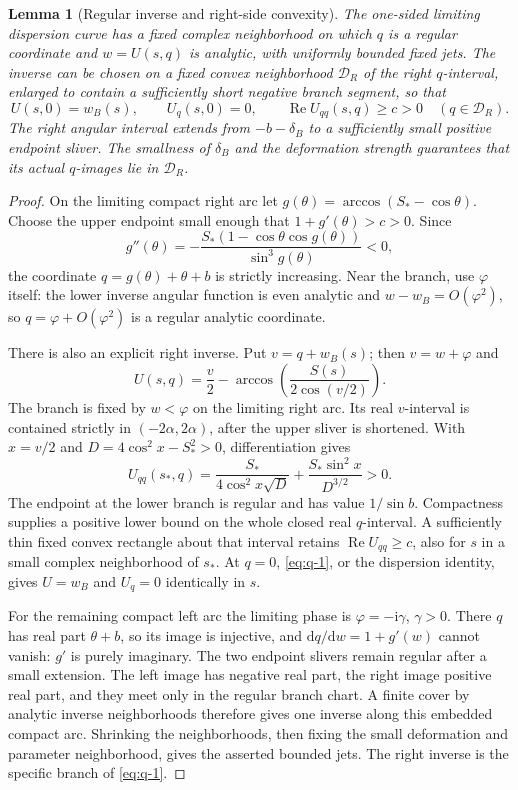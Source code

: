 \documentclass[11pt]{article}
\numberwithin{equation}{section}
\newtheorem{lemma}[theorem]{Lemma}
\theoremstyle{remark}\newtheorem{remark}[theorem]{Remark}
\newcommand{\ii}{\mathrm i}
\newcommand{\dd}{\mathrm d}
\newcommand{\Rea}{\operatorname{Re}}
\begin{document}
\begin{lemma}[Regular inverse and right-side convexity]\label{lem:inverse}
The one-sided limiting dispersion curve has a fixed complex
neighborhood on which $q$ is a regular coordinate and $w=U(s,q)$ is
analytic, with uniformly bounded fixed jets. The inverse can be chosen
on a fixed convex neighborhood $\mathcal D_R$ of the right $q$-interval,
enlarged to contain a sufficiently short negative branch segment, so
that
\[
 U(s,0)=w_B(s),\qquad U_q(s,0)=0,\qquad
 \Rea U_{qq}(s,q)\ge c>0 \quad(q\in\mathcal D_R).
\]
The right angular interval extends from $-b-\delta_B$ to a sufficiently
small positive endpoint sliver. The smallness of $\delta_B$ and the
deformation strength guarantees that its actual $q$-images lie in
$\mathcal D_R$.
\end{lemma}
\begin{proof}
On the limiting compact right arc let
$g(\theta)=\arccos(S_*-\cos\theta)$. Choose the upper endpoint small
enough that $1+g'(\theta)>c>0$. Since
\[
 g''(\theta)=-\frac{S_*(1-\cos\theta\cos g(\theta))}{\sin^3g(\theta)}<0,
\]
the coordinate $q=g(\theta)+\theta+b$ is strictly increasing. Near the
branch, use $\varphi$ itself: the lower inverse angular function is
even analytic and $w-w_B=O(\varphi^2)$, so
$q=\varphi+O(\varphi^2)$ is a regular analytic coordinate.

There is also an explicit right inverse. Put $v=q+w_B(s)$; then
$v=w+\varphi$ and
\begin{equation}\label{eq:q-1}
U(s,q)=\frac v2-
 \arccos\left(\frac{S(s)}{2\cos(v/2)}\right).
\end{equation}
The branch is fixed by $w<\varphi$ on the limiting right arc. Its real
$v$-interval is contained strictly in $(-2\alpha,2\alpha)$, after the
upper sliver is shortened. With $x=v/2$ and
$D=4\cos^2x-S_*^2>0$, differentiation gives
\begin{equation}\label{eq:q-2}
U_{qq}(s_*,q)=\frac{S_*}{4\cos^2x\sqrt D}
                  +\frac{S_*\sin^2x}{D^{3/2}}>0.
\end{equation}
The endpoint at the lower branch is regular and has value
$1/\sin b$. Compactness supplies a positive lower bound on the whole
closed real $q$-interval. A sufficiently thin fixed convex rectangle
about that interval retains $\Rea U_{qq}\ge c$, also for $s$ in a
small complex neighborhood of $s_*$. At $q=0$, \eqref{eq:q-1}, or the dispersion
identity, gives $U=w_B$ and $U_q=0$ identically in $s$.

For the remaining compact left arc the limiting phase is
$\varphi=-\ii\gamma$, $\gamma>0$. There $q$ has real part
$\theta+b$, so its image is injective, and
$\dd q/\dd w=1+g'(w)$ cannot vanish: $g'$ is purely imaginary.
The two endpoint slivers remain regular after a small extension. The
left image has negative real part, the right image positive real part,
and they meet only in the regular branch chart. A finite cover by
analytic inverse neighborhoods therefore gives one inverse along this
embedded compact arc. Shrinking the neighborhoods, then fixing the
small deformation and parameter neighborhood, gives the asserted
bounded jets. The right inverse is the specific branch of \eqref{eq:q-1}.
\end{proof}
\end{document}
